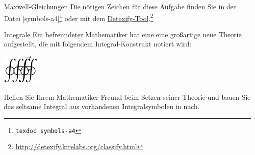 \documentclass[
	vorläufig=false, 
	blattnr=2,
	ausgabe=2016-11-04,
	abgabe=2016-11-11,
	shortverb,
]{../tex/latexkurs-exercise}
\begin{document}
\begin{aufgabe}[6]{Maxwell-Gleichungen}
   Die nötigen Zeichen für diese Aufgabe finden Sie in der Datei |symbols-a4|\footnote{\texttt{texdoc symbols-a4}} oder mit dem \href{http://detexify.kirelabs.org/classify.html}{Detexify-Tool}.\footnote{\url{http://detexify.kirelabs.org/classify.html}}                                                              
                                                                                                                                                                                                                                                                                                                               
\end{aufgabe}


\begin{aufgabe}[3]{Integrale}
   Ein befreundeter Mathematiker hat eine eine großartige neue Theorie aufgestellt, die mit folgendem Integral-Konstrukt notiert wird:                                                                                                                                                                                    
   \begin{center}                                                                                                                                                                                                                                                                                                         
        \includegraphics{02_komischeintegrale} %
   \end{center}                                                                                                                                                                                                                                                                                                           
   Helfen Sie Ihrem Mathematiker-Freund beim Setzen seiner Theorie und bauen Sie das seltsame Integral aus vorhandenen Integralsymbolen in  nach.                                                                                                                                                        
   
\end{aufgabe}
\end{document}
